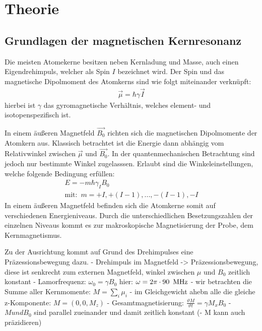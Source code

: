 \section{Theorie}
\label{sec:Theorie}
\subsection{Grundlagen der magnetischen Kernresonanz}
Die meisten Atomekerne besitzen neben Kernladung und Masse, auch einen Eigendrehimpuls, welcher als Spin $I$ bezeichnet wird.
Der Spin und das magnetische Dipolmoment des Atomkerns sind wie folgt miteinander verkn\"{u}pft:
\begin{align}
	\overrightarrow{\mu} = \hbar \gamma \overrightarrow{I}
\end{align}
hierbei ist $\gamma$ das gyromagnetische Verh\"{a}ltnis, welches element- und isotopenspezifisch ist.

In einem \"{a}u{\ss}eren Magnetfeld $\overrightarrow{B_0}$ richten sich die magnetischen Dipolmomente der Atomkern aus.
Klassisch betrachtet ist die Energie dann abh\"{a}ngig vom Relativwinkel zwischen $\overrightarrow{\mu}$ und $\overrightarrow{B_0}$.
In der quantenmechanischen Betrachtung sind jedoch nur bestimmte Winkel zugelasssen.
Erlaubt sind die Winkeleinstellungen, welche folgende Bedingung erf\"{u}llen:
\begin{align}
	E = -m \hbar \gamma_I B_0  \\
	\text{mit:} \, \, \,  m = +I, +(I-1), ..., -(I-1), -I
\end{align}
In einem \"{a}u{\ss}eren Magnetfeld befinden sich die Atomkerne somit auf verschiedenen Energieniveaus.
Durch die unterschiedlichen Besetzungszahlen der einzelnen Niveaus kommt es zur  makroskopische Magnetisierung der Probe, dem Kernmagnetismus.

Zu der Ausrichtung kommt auf Grund des Drehimpulses eine Pr\"{a}zessionsbewegung dazu.
- Drehimpuls im Magnetfeld -> Pr\"{a}zessionsbewegung, diese ist senkrecht zum externen Magnetfeld, winkel zwischen $\mu$ und $B_0$ zeitlich konstant
- Lamorfrequenz: $\omega_0 = \gamma B_0$ hier: $\omega = 2\pi \cdot 90 \text{\, MHz}$
- wir betrachten die Summe aller Kernmomente: $M = \sum_i \mu_i$
- im Gleichgewicht ahebn alle die gleiche z-Komponente: $M = (0,0,M_z)$
- Gesamtmagnetisierung: $\frac{\vartheta M}{\vartheta t} = \gamma M_x B_0$
- $M und B_0$ sind parallel zueinander und damit zeitlich konstant
(- M kann auch pr\"{a}zidieren)

